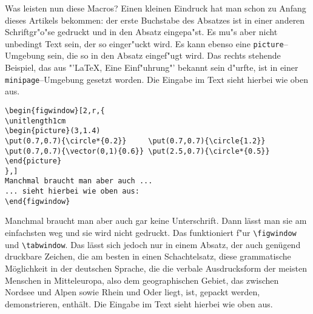 \begin{figwindow}
Was leisten nun diese Macros? Einen kleinen Eindruck hat man schon
zu Anfang dieses Artikels bekommen: der erste Buchstabe des Absatzes
ist in einer anderen Schriftgr"o"se gedruckt und in den Absatz eingepa"st.
Es mu"s aber nicht unbedingt Text sein, der so einger"uckt wird. Es kann
ebenso eine \verb?picture?--Umgebung sein, die so in den Absatz eingef"ugt
wird. Das rechts stehende Beispiel, das aus "'\LaTeX , Eine Einf"uhrung"'
bekannt sein d"urfte, ist in einer \verb?minipage?--Umgebung gesetzt
worden. Die Eingabe im Text sieht hierbei wie oben aus.
\end{figwindow}



\begin{verbatim}
\begin{figwindow}[2,r,{
\unitlength1cm
\begin{picture}(3,1.4)
\put(0.7,0.7){\circle*{0.2}}     \put(0.7,0.7){\circle{1.2}}
\put(0.7,0.7){\vector(0,1){0.6}} \put(2.5,0.7){\circle*{0.5}}
\end{picture}
},]
Manchmal braucht man aber auch ...
... sieht hierbei wie oben aus:
\end{figwindow}
\end{verbatim}

\begin{figwindow}
Manchmal braucht man aber auch gar keine Unterschrift. Dann lässt man sie am einfachsten weg und sie wird nicht gedruckt.
Das funktioniert f"ur \verb+\figwindow+ und \verb+\tabwindow+.
Das lässt sich jedoch nur in einem Absatz, der auch genügend druckbare Zeichen, die am besten in einen Schachtelsatz, diese grammatische Möglichkeit in der deutschen Sprache, die die verbale Ausdrucksform der meisten Menschen in Mitteleuropa, also dem geographischen Gebiet, das zwischen Nordsee und Alpen sowie Rhein und Oder liegt, ist, gepackt werden, demonstrieren, enthält.
Die Eingabe im Text sieht hierbei wie oben aus.
\end{figwindow}


